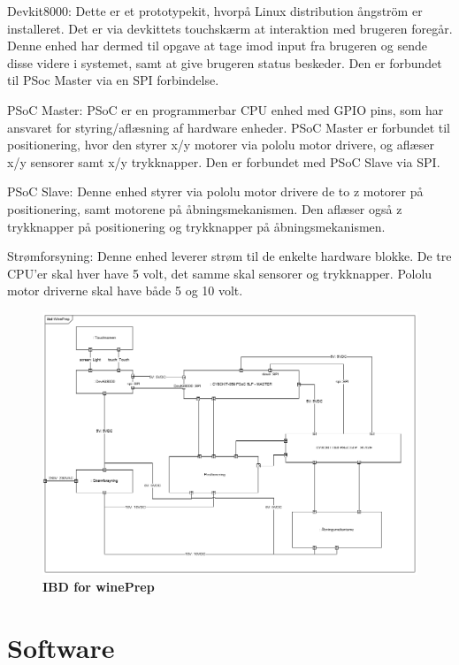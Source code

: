 Devkit8000: 
Dette er et prototypekit, hvorpå Linux distribution ångström er installeret. Det er via devkittets touchskærm at interaktion med brugeren foregår. 
Denne enhed har dermed til opgave at tage imod input fra brugeren og sende disse videre i systemet, samt at give brugeren status beskeder. Den er forbundet til
PSoc Master via en SPI forbindelse.

PSoC Master:
PSoC er en programmerbar CPU enhed med GPIO pins, som har ansvaret for styring/aflæsning af hardware enheder. PSoC Master er forbundet til positionering, 
hvor den styrer x/y motorer via pololu motor drivere, og aflæser x/y sensorer samt x/y trykknapper. Den er forbundet med PSoC Slave via SPI.  

PSoC Slave:
Denne enhed styrer via pololu motor drivere de to z motorer på positionering, samt motorene på åbningsmekanismen. Den aflæser også z trykknapper på 
positionering og trykknapper på åbningsmekanismen.  

Strømforsyning:
Denne enhed leverer strøm til de enkelte hardware blokke. De tre CPU'er skal hver have 5 volt, det samme skal sensorer og trykknapper. Pololu motor driverne 
skal have både 5 og 10 volt.\\

\begin{figure}[H]
\includegraphics[scale=0.35]{tex/Arkitektur/Fotos/HW/IBD_winePrep}
\caption{\textbf{IBD for winePrep}}
\end{figure}


\section{Software}

